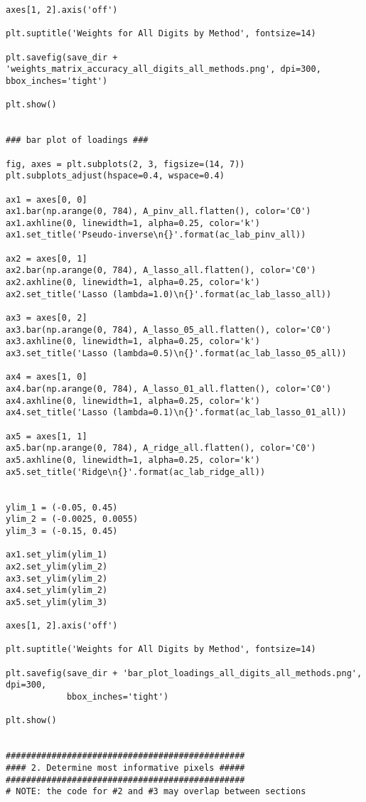 \documentclass[10pt]{article}
\begin{document}
\begin{lstlisting}
axes[1, 2].axis('off')

plt.suptitle('Weights for All Digits by Method', fontsize=14)

plt.savefig(save_dir + 'weights_matrix_accuracy_all_digits_all_methods.png', dpi=300, bbox_inches='tight')

plt.show()


### bar plot of loadings ###

fig, axes = plt.subplots(2, 3, figsize=(14, 7))
plt.subplots_adjust(hspace=0.4, wspace=0.4)

ax1 = axes[0, 0]
ax1.bar(np.arange(0, 784), A_pinv_all.flatten(), color='C0')
ax1.axhline(0, linewidth=1, alpha=0.25, color='k')
ax1.set_title('Pseudo-inverse\n{}'.format(ac_lab_pinv_all))

ax2 = axes[0, 1]
ax2.bar(np.arange(0, 784), A_lasso_all.flatten(), color='C0')
ax2.axhline(0, linewidth=1, alpha=0.25, color='k')
ax2.set_title('Lasso (lambda=1.0)\n{}'.format(ac_lab_lasso_all))
        
ax3 = axes[0, 2]
ax3.bar(np.arange(0, 784), A_lasso_05_all.flatten(), color='C0')
ax3.axhline(0, linewidth=1, alpha=0.25, color='k')
ax3.set_title('Lasso (lambda=0.5)\n{}'.format(ac_lab_lasso_05_all))

ax4 = axes[1, 0]
ax4.bar(np.arange(0, 784), A_lasso_01_all.flatten(), color='C0')
ax4.axhline(0, linewidth=1, alpha=0.25, color='k')
ax4.set_title('Lasso (lambda=0.1)\n{}'.format(ac_lab_lasso_01_all))

ax5 = axes[1, 1]
ax5.bar(np.arange(0, 784), A_ridge_all.flatten(), color='C0')
ax5.axhline(0, linewidth=1, alpha=0.25, color='k')
ax5.set_title('Ridge\n{}'.format(ac_lab_ridge_all))


ylim_1 = (-0.05, 0.45)
ylim_2 = (-0.0025, 0.0055)
ylim_3 = (-0.15, 0.45)

ax1.set_ylim(ylim_1)
ax2.set_ylim(ylim_2)
ax3.set_ylim(ylim_2)
ax4.set_ylim(ylim_2)
ax5.set_ylim(ylim_3)

axes[1, 2].axis('off')

plt.suptitle('Weights for All Digits by Method', fontsize=14)

plt.savefig(save_dir + 'bar_plot_loadings_all_digits_all_methods.png', dpi=300,
            bbox_inches='tight')
    
plt.show()


###############################################
#### 2. Determine most informative pixels #####
###############################################
# NOTE: the code for #2 and #3 may overlap between sections


\end{lstlisting}
\end{document}
